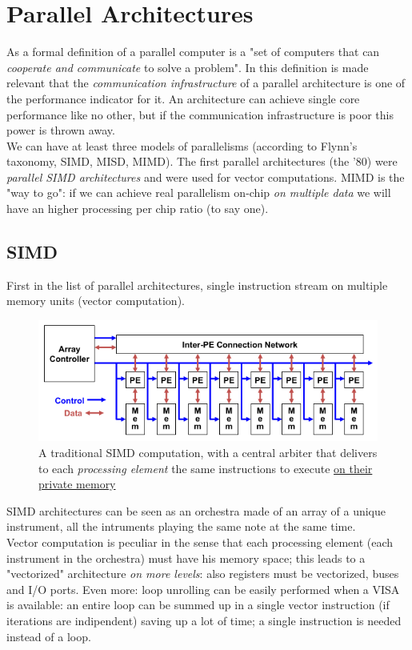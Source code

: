\documentclass[10pt,a4paper]{article}
\begin{document}
		\section{Parallel Architectures}
			As a formal definition of a parallel computer is a "set of computers that can \emph{cooperate and communicate} to solve a problem". In this definition is made relevant that the \emph{communication infrastructure} of a parallel architecture is one of the performance indicator for it. An architecture can achieve single core performance like no other, but if the communication infrastructure is poor this power is thrown away.\\
			We can have at least three models of parallelisms (according to Flynn's taxonomy, SIMD, MISD, MIMD). The first parallel architectures (the '80) were \emph{parallel SIMD architectures} and were used for vector computations. MIMD is the "way to go": if we can achieve real parallelism on-chip \emph{on multiple data} we will have an higher processing per chip ratio (to say one).
			
			\subsection{SIMD}
				First in the list of parallel architectures, single instruction stream on multiple memory units (vector computation).
				\begin{figure}[H]
					\centering
					\includegraphics[width = \textwidth]{./images/SIMD.png}
					\caption{A traditional SIMD computation, with a central arbiter that delivers to each \emph{processing element} the same instructions to execute \underline{on their private memory}}
				\end{figure}
				SIMD architectures can be seen as an orchestra made of an array of a unique instrument, all the intruments playing the same note at the same time.\\
				Vector computation is peculiar in the sense that each processing element (each instrument in the orchestra) must have his memory space; this leads to a "vectorized" architecture \emph{on more levels}: also registers must be vectorized, buses and I/O ports. Even more: loop unrolling can be easily performed when a VISA is available: an entire loop can be summed up in a single vector instruction (if iterations are indipendent) saving up a lot of time; a single instruction is needed instead of a loop. 
				
\end{document}

